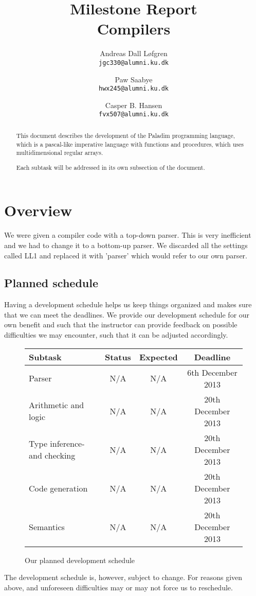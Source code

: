 \documentclass[11pt]{article}
\title%
{%
	{\large Milestone Report}\\
	Compilers
}
\author%
{%
	Andreas Dall Løfgren\\
	{\tt jgc330@alumni.ku.dk}
	\and
	Paw Saabye\\
	{\tt hwx245@alumni.ku.dk}
	\and
	Casper B. Hansen\\
	{\tt fvx507@alumni.ku.dk}
}
\begin{document}
\clearpage
\maketitle
\thispagestyle{empty}
\begin{multicols}{2}
\begin{abstract}
This document describes the development of the Paladim programming language,
which is a pascal-like imperative language with functions and procedures, which
uses multidimensional regular arrays.

Each subtask will be addressed in its own subsection of the document.
\end{abstract}
\vfill
\columnbreak%
\tableofcontents
\end{multicols}

\clearpage
\section{Overview}
We were given a compiler code with a top-down parser. This is very inefficient 
and we had to change it to a bottom-up parser. We discarded all the settings 
called LL1 and replaced it with 'parser' which would refer to our own parser. 

\subsection{Planned schedule}
Having a development schedule helps us keep things organized and makes sure
that we can meet the deadlines. We provide our development schedule for our
own benefit and such that the instructor can provide feedback on possible
difficulties we may encounter, such that it can be  adjusted accordingly.
\begin{figure}[H]
	\centering
	\begin{tabular}{|l|c|c|c|}
		\hline
		{\bf Subtask} & {\bf Status} & {\bf Expected} & {\bf Deadline} \\ \hline
		Parser & N/A & N/A & 6th December 2013 \\ \hline
		Arithmetic and logic & N/A & N/A & 20th December 2013 \\ \hline
		Type inference- and checking & N/A & N/A & 20th December 2013 \\ \hline
		Code generation & N/A & N/A & 20th December 2013 \\ \hline
		Semantics & N/A & N/A & 20th December 2013 \\ \hline
	\end{tabular}
	\label{table:schedule}
	\caption{Our planned development schedule}
\end{figure}
The development schedule is, however, subject to change. For reasons given
above, and unforeseen difficulties may or may not force us to reschedule.
\end{document}
